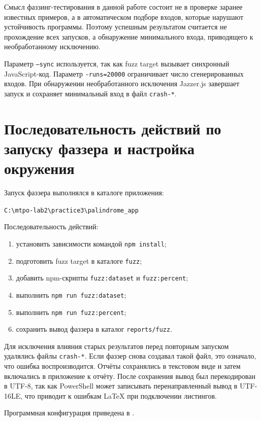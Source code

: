 Смысл фаззинг-тестирования в данной работе состоит не в проверке заранее известных
примеров, а в автоматическом подборе входов, которые нарушают устойчивость
программы. Поэтому успешным результатом считается не прохождение всех запусков, а
обнаружение минимального входа, приводящего к необработанному исключению.

Параметр \texttt{--sync} используется, так как fuzz target вызывает синхронный
JavaScript-код. Параметр \texttt{-runs=20000} ограничивает число сгенерированных
входов. При обнаружении необработанного исключения Jazzer.js завершает запуск и
сохраняет минимальный вход в файл \texttt{crash-*}.

\section{Последовательность действий по запуску фаззера и настройка окружения} \label{ch1:sec2}

Запуск фаззера выполнялся в каталоге приложения:
\begin{center}
\texttt{C:\textbackslash mtpo-lab2\textbackslash practice3\textbackslash palindrome\_app}
\end{center}

Последовательность действий:
\begin{enumerate}
    \item установить зависимости командой \texttt{npm install};
    \item подготовить fuzz target в каталоге \texttt{fuzz};
    \item добавить npm-скрипты \texttt{fuzz:dataset} и \texttt{fuzz:percent};
    \item выполнить \texttt{npm run fuzz:dataset};
    \item выполнить \texttt{npm run fuzz:percent};
    \item сохранить вывод фаззера в каталог \texttt{reports/fuzz}.
\end{enumerate}

Для исключения влияния старых результатов перед повторным запуском удалялись
файлы \texttt{crash-*}. Если фаззер снова создавал такой файл, это означало, что
ошибка воспроизводится. Отчёты сохранялись в текстовом виде и затем включались в
приложение к отчёту. После сохранения вывод был перекодирован в UTF-8, так как
PowerShell может записывать перенаправленный вывод в UTF-16LE, что приводит к
ошибкам LaTeX при подключении листингов.

Программная конфигурация приведена в .

